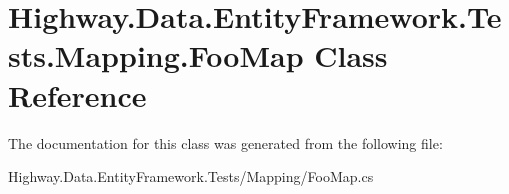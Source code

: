 \hypertarget{class_highway_1_1_data_1_1_entity_framework_1_1_tests_1_1_mapping_1_1_foo_map}{\section{Highway.\-Data.\-Entity\-Framework.\-Tests.\-Mapping.\-Foo\-Map Class Reference}
\label{class_highway_1_1_data_1_1_entity_framework_1_1_tests_1_1_mapping_1_1_foo_map}
}


The documentation for this class was generated from the following file\-:\begin{DoxyCompactItemize}
\item 
Highway.\-Data.\-Entity\-Framework.\-Tests/\-Mapping/Foo\-Map.\-cs\end{DoxyCompactItemize}
